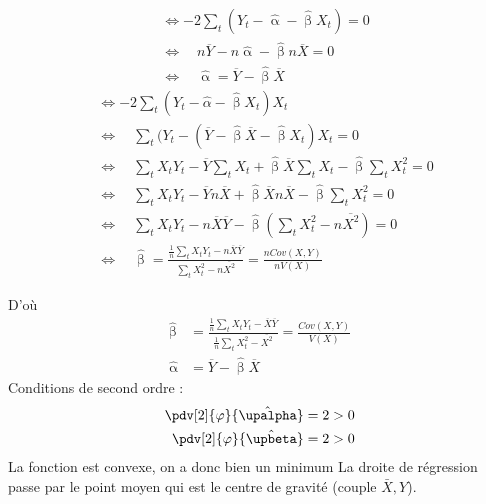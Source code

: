 \documentclass{article}
\begin{document}
\begin{multicols}{2}
\begin{equation*}
\begin{split}
	&\Leftrightarrow -2 \sum_t (Y_t - \hat{\upalpha} - \hat{\upbeta} X_t ) = 0 \\
	&\Leftrightarrow \quad n \overline{Y} - n \hat{\upalpha} - \hat{\upbeta} n \overline{X} = 0 \\
	&\Leftrightarrow \quad \hat{\upalpha} = \overline{Y} - \hat{\upbeta}  \overline{X}
\end{split}
\end{equation*}
\columnbreak
\begin{equation*}
\begin{split}
 	&\Leftrightarrow-2 \sum_t (Y_t - \hat{\alpha} - \hat{\upbeta} X_t) X_t \\
	&\Leftrightarrow \quad \sum_t (Y_t - (\overline{Y} - \hat{\upbeta} \overline{X} - \hat{\upbeta} X_t) X_t = 0 \\
	&\Leftrightarrow \quad \sum_t X_tY_t - \overline{Y} \sum_t X_t + \hat{\upbeta} \overline{X} \sum_t X_t - \hat{\upbeta} \sum_t X_t^2 = 0\\
	&\Leftrightarrow \quad \sum_t X_tY_t - \overline{Y} n \overline{X} + \hat{\upbeta} \overline{X} n \overline{X} - \hat{\upbeta} \sum_t X_t^2 = 0 \\
	&\Leftrightarrow \quad \sum_t X_tY_t - n \overline{X} \overline{Y} - \hat{\upbeta} (\sum_t X_t^2 -n \overline{X^2}) = 0 \\
	&\Leftrightarrow \quad \hat{\upbeta} = \frac{\frac{1}{n}\sum_t X_tY_t - n \overline{X} \overline{Y}}{\sum_t X_t^2 -n \overline{X^2}} = \frac{n Cov(X,Y)}{n V(X)}
\end{split}
\end{equation*}
\end{multicols}
D'où
{
\color{red}
\begin{align*}
	\hat{\upbeta} &= \frac{\frac{1}{n}\sum_t X_tY_t - \overline{X} \overline{Y}}{\frac{1}{n}\sum_t X_t^2 - \overline{X^2}} = \frac{Cov(X,Y)}{V(X)} \\
	\hat{\upalpha} &= \overline{Y} - \hat{\upbeta} \overline{X}
\end{align*}
}
Conditions de second ordre : 
\begin{align*}
	\pdv[2]{\varphi}{\hat{\upalpha}} &= 2 >0 \\
	\pdv[2]{\varphi}{\hat{\upbeta}} &= 2 >0
\end{align*}
La fonction est convexe, on a donc bien un minimum 
\newpage
La droite de régression passe par le point moyen qui est le centre de gravité (couple \(\bar{X},Y\)).
\end{document}
